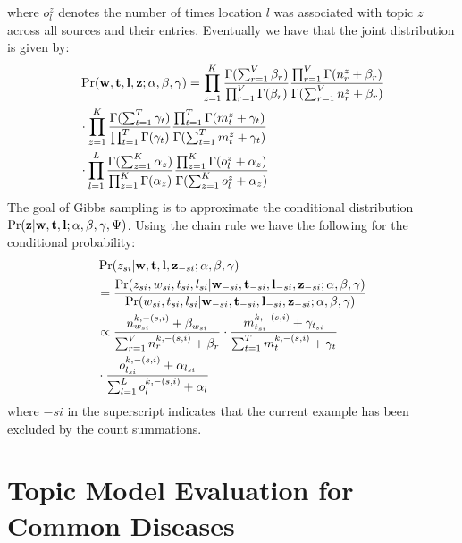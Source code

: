 \documentclass[twoside,leqno,twocolumn]{article}
\newcommand{\w}{{\bf w}}
\newcommand{\z}{{\bf z}}
\newcommand{\loc}{{\bf l}}
\newcommand{\tim}{{\bf t}}
\begin{document}
where $o^z_l$ denotes the number of times location $l$ was associated with topic $z$ across all sources and their entries. 
Eventually we have that the joint distribution is given by:
{\scriptsize
\begin{align}
&\Pr(\w,\tim,\loc,\z;\alpha,\beta,\gamma) = \prod_{z = 1}^K \frac{\Gamma(\sum_{r = 1}^V \beta_r)}{\prod_{r = 1}^V \Gamma(\beta_r)} \frac{\prod_{r = 1}^V \Gamma(n^{z}_{r} + \beta_r)}{\Gamma(\sum_{r =1}^V n^{z}_{r} + \beta_r)} \nonumber \\
&\cdot \prod_{z = 1}^K \frac{\Gamma(\sum_{t = 1}^T \gamma_t)}{\prod_{t = 1}^T \Gamma(\gamma_t)} \frac{\prod_{t = 1}^T \Gamma(m^{z}_{t} + \gamma_t)}{\Gamma(\sum_{t =1}^T m^{z}_{t} + \gamma_t)} \nonumber \\
& \cdot \prod_{l =1}^L\frac{\Gamma(\sum_{z = 1}^K \alpha_z)}{\prod_{z = 1}^K \Gamma(\alpha_z)}\frac{\prod_{z=1}^K\Gamma(o^z_l + \alpha_z)}{\Gamma(\sum_{z = 1}^K o^z_l + \alpha_z)}  \nonumber
\end{align}}
The goal of Gibbs sampling is to approximate the conditional distribution $\Pr(\z | \w, \tim,\loc;\alpha,\beta,\gamma,\Psi)$. Using the chain rule we have the following for the conditional probability:
{\scriptsize
\begin{align}
&\Pr(z_{si}| \w,\tim,\loc,\z_{-si};\alpha,\beta,\gamma) \nonumber \\
&= \frac{\Pr(z_{si}, w_{si}, t_{si}, l_{si}|\w_{-si},\tim_{-si},\loc_{-si},\z_{-si};\alpha,\beta,\gamma)}{\Pr(w_{si}, t_{si}, l_{si}|\w_{-si},\tim_{-si},\loc_{-si},\z_{-si};\alpha,\beta,\gamma)} \nonumber \\
& \propto \frac{n^{k,-(s,i)}_{w_{si}} + \beta_{w_{si}}}{\sum_{r = 1}^V n^{k,-(s,i)}_{r} + \beta_{r}} \cdot \frac{m^{k,-(s,i)}_{t_{si}} + \gamma_{t_{si}}}{\sum_{t = 1}^T m^{k,-(s,i)}_{t} + \gamma_{t}} \nonumber \\
& \cdot \frac{o^{k,-(s,i)}_{l_{si}} + \alpha_{l_{si}}}{\sum_{l = 1}^L o^{k,-(s,i)}_{l} + \alpha_{l}} \nonumber
\end{align}}
where $-si$ in the superscript indicates that the current example has been excluded by the count summations. 

\section{Topic Model Evaluation for Common Diseases}
\label{sec:common_topics}
\end{document}
